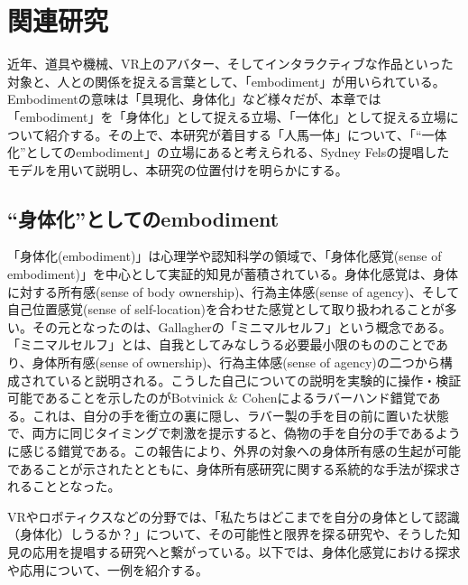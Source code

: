 \chapter{関連研究}
\label{related_works}

近年、道具や機械、VR上のアバター、そしてインタラクティブな作品といった対象と、人との関係を捉える言葉として、「embodiment」が用いられている。Embodimentの意味は「具現化、身体化」など様々だが、本章では「embodiment」を「身体化」として捉える立場、「一体化」として捉える立場について紹介する。その上で、本研究が着目する「人馬一体」について、「``一体化''としてのembodiment」の立場にあると考えられる、Sydney Felsの提唱したモデルを用いて説明し、本研究の位置付けを明らかにする。

\section{``身体化''としてのembodiment}
「身体化(embodiment)」は心理学や認知科学の領域で、「身体化感覚(sense of embodiment)」を中心として実証的知見が蓄積されている。身体化感覚は、身体に対する所有感(sense of body ownership)、行為主体感(sense of agency)、そして自己位置感覚(sense of self-location)を合わせた感覚として取り扱われることが多い\cite{kilteni2012}。その元となったのは、Gallagherの「ミニマルセルフ」という概念である。「ミニマルセルフ」とは、自我としてみなしうる必要最小限のもののことであり、身体所有感(sense of ownership)、行為主体感(sense of agency)の二つから構成されていると説明される\cite{Gallagher2000}。こうした自己についての説明を実験的に操作・検証可能であることを示したのがBotvinick \& Cohenによるラバーハンド錯覚\cite{BotvinickCohen1998}である。これは、自分の手を衝立の裏に隠し、ラバー製の手を目の前に置いた状態で、両方に同じタイミングで刺激を提示すると、偽物の手を自分の手であるように感じる錯覚である。この報告により、外界の対象への身体所有感の生起が可能であることが示されたとともに、身体所有感研究に関する系統的な手法が探求されることとなった。

VRやロボティクスなどの分野では、「私たちはどこまでを自分の身体として認識（身体化）しうるか？」について、その可能性と限界を探る研究や、そうした知見の応用を提唱する研究へと繋がっている。以下では、身体化感覚における探求や応用について、一例を紹介する。

